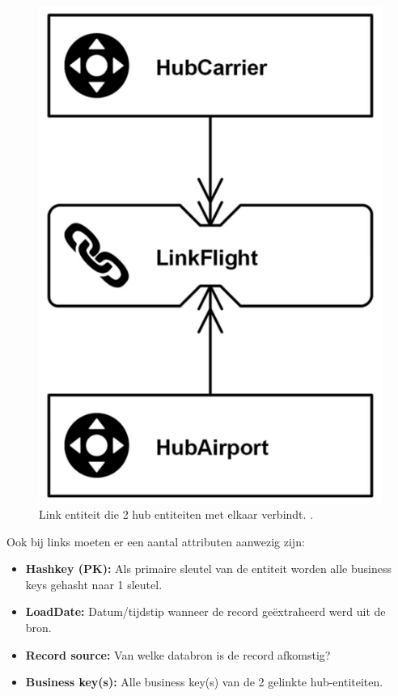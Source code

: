 \begin{figure}[h]
	\centering
	\includegraphics[scale=0.3]{../images/link.png}
	\caption{Link entiteit die 2 hub entiteiten met elkaar verbindt. \autocite{Linstedt2016}.}
	\label{fig:link}
\end{figure}

Ook bij links moeten er een aantal attributen aanwezig zijn:

\begin{itemize}
	\item \textbf{Hashkey (PK):} Als primaire sleutel van de entiteit worden alle business keys gehasht naar 1 sleutel.
	\item \textbf{LoadDate:} Datum/tijdstip wanneer de record geëxtraheerd werd uit de bron.
	\item \textbf{Record source:} Van welke databron is de record afkomstig?
	\item \textbf{Business key(s):} Alle business key(s) van de 2 gelinkte hub-entiteiten.
\end{itemize} 

